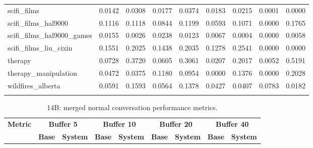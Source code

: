 \begin{landscape}
\begin{longtable}{@{}p{3.8cm}cccccccc@{}}
scifi\_films & 0.0142 & 0.0308 & 0.0177 & 0.0374 & 0.0183 & 0.0215 & 0.0001 & 0.0000 \\
scifi\_films\_hal9000 & 0.1116 & 0.1118 & 0.0844 & 0.1199 & 0.0593 & 0.1071 & 0.0000 & 0.1765 \\
scifi\_films\_hal9000\_games & 0.0155 & 0.0026 & 0.0238 & 0.0123 & 0.0067 & 0.0004 & 0.0000 & 0.0058 \\
scifi\_films\_liu\_cixin & 0.1551 & 0.2025 & 0.1438 & 0.2035 & 0.1278 & 0.2541 & 0.0000 & 0.0000 \\
therapy & 0.0728 & 0.3720 & 0.0605 & 0.3061 & 0.0207 & 0.2017 & 0.0052 & 0.5191 \\
therapy\_manipulation & 0.0472 & 0.0375 & 0.1180 & 0.0954 & 0.0000 & 0.1376 & 0.0000 & 0.2028 \\
wildfires\_alberta & 0.0591 & 0.1593 & 0.0564 & 0.1378 & 0.0427 & 0.0407 & 0.0783 & 0.0182 \\
\botrule
\end{longtable}
\begin{longtable}{@{}p{3.8cm}cccccccc@{}}
\caption{14B: merged normal conversation performance metrics.}\label{tab:app_14b_perf_normal}\\

\toprule
\textbf{Metric} & \multicolumn{2}{c}{\textbf{Buffer 5}} & \multicolumn{2}{c}{\textbf{Buffer 10}} & \multicolumn{2}{c}{\textbf{Buffer 20}} & \multicolumn{2}{c}{\textbf{Buffer 40}} \\
\cmidrule(lr){2-3}\cmidrule(lr){4-5}\cmidrule(lr){6-7}\cmidrule(lr){8-9}
 & \textbf{Base} & \textbf{System} & \textbf{Base} & \textbf{System} & \textbf{Base} & \textbf{System} & \textbf{Base} & \textbf{System} \\
\midrule
\endfirsthead


\end{longtable}
\end{landscape}
